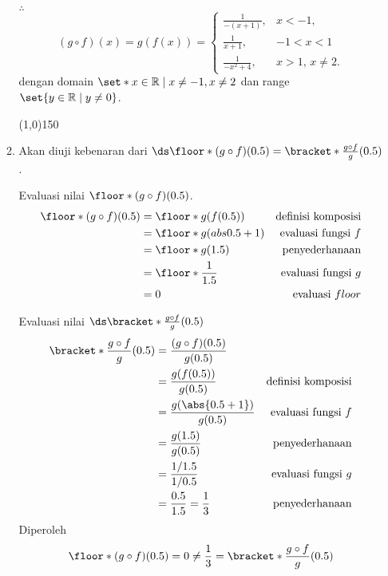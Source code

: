 \begin{enumerate}[leftmargin=*, label={\arabic*}.]
\begin{enumerate}[label={\alph*}.]
$\therefore$ 
\[
    (g\circ f)(x) = g(f(x)) = 
    \begin{cases}
        \frac{1}{-(x+1)}, & x < -1,\\
        \frac{1}{x+1}, &-1 < x < 1 \\
        \frac{1}{-x^{2}+4}, &x > 1,\,x \neq 2.
    \end{cases}
\]
dengan domain $\set*{x \in \mathbb{R} \mid x \neq -1, x\neq 2}$ dan range
$\set{y \in \mathbb{R} \mid y \neq 0}$.
\begin{center}
    \line(1,0){150}
\end{center}
\item Akan diuji kebenaran dari 
$\ds \floor*{(g \circ f)(0.5)} = \bracket*{\frac{g \circ f}{g}}(0.5)$.

Evaluasi nilai $\floor*{(g \circ f)(0.5)}$.
\begin{align*}
    \floor*{(g \circ f)(0.5)}
    &= \floor*{g(f(0.5))}
    &\text{definisi komposisi} \\
    &= \floor*{g(abs{0.5+1})} 
    &\text{evaluasi fungsi $f$} \\
    &= \floor*{g(1.5)}
    &\text{penyederhanaan}\\
    &=\floor*{\frac{1}{1.5}}
    &\text{evaluasi fungsi $g$}\\
    &=0 
    &\text{evaluasi $floor$}
\end{align*}

Evaluasi nilai $\ds \bracket*{\frac{g \circ f}{g}}(0.5)$
\begin{align*}
    \bracket*{\frac{g \circ f}{g}}(0.5) &= \frac{(g\circ f)(0.5)}{g(0.5)}\\
    &= \frac{g(f(0.5))}{g(0.5)} 
    &\text{definisi komposisi}\\
    &= \frac{g(\abs{0.5+1})}{g(0.5)}
    &\text{evaluasi fungsi $f$} \\
    &= \frac{g(1.5)}{g(0.5)} 
    &\text{penyederhanaan}\\
    &= \frac{1/1.5}{1/0.5}
    &\text{evaluasi fungsi $g$}\\
    &=\frac{0.5}{1.5} = \frac{1}{3}
    &\text{penyederhanaan}
\end{align*}
Diperoleh 
\[
    \floor*{(g \circ f)(0.5)} = 0 \neq \frac{1}{3} = \bracket*{\frac{g \circ f}{g}}(0.5)
\]


\end{enumerate}
\end{enumerate}
